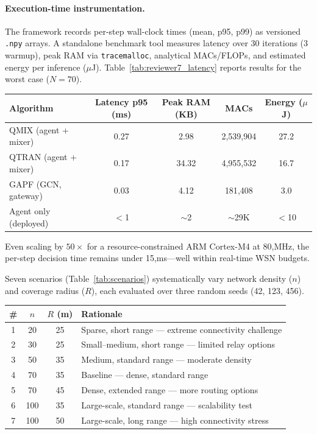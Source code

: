 \documentclass[12pt, onecolumn, journal]{IEEEtran}
\newcounter{reviewer}
\begin{document}
\paragraph{Execution-time instrumentation.}
The framework records per-step wall-clock times (mean, p95, p99) as versioned \texttt{.npy} arrays. A standalone benchmark tool measures latency over 30 iterations (3 warmup), peak RAM via \texttt{tracemalloc}, analytical MACs/FLOPs, and estimated energy per inference ($\mu$J). Table~\ref{tab:reviewer7_latency} reports results for the worst case ($N{=}70$).

\begin{center}
\label{tab:reviewer7_latency}
\renewcommand{\arraystretch}{1.15}
\begin{tabular}{@{}lcccc@{}}
\toprule
\textbf{Algorithm} & \textbf{Latency p95 (ms)} & \textbf{Peak RAM (KB)} & \textbf{MACs} & \textbf{Energy ($\mu$J)} \\
\midrule
QMIX (agent + mixer)   & 0.27 & 2.98  & 2{,}539{,}904 & 27.2 \\
QTRAN (agent + mixer)   & 0.17 & 34.32 & 4{,}955{,}532 & 16.7 \\
GAPF (GCN, gateway)     & 0.03 & 4.12  & 181{,}408     & 3.0  \\
\midrule
Agent only (deployed)    & $<$1 & $\sim$2 & $\sim$29K  & $<$10 \\
\bottomrule
\end{tabular}
\end{center}

Even scaling by $50\times$ for a resource-constrained ARM Cortex-M4 at 80,MHz, the per-step decision time remains under 15,ms---well within real-time WSN budgets.

Seven scenarios (Table~\ref{tab:scenarios}) systematically vary network density ($n$) and coverage radius ($R$), each evaluated over three random seeds (42, 123, 456).

\begin{center}
\label{tab:scenarios}
\begin{tabular}{cccl}
\hline
\textbf{\#} & $n$ & $R$ (m) & \textbf{Rationale} \\
\hline
1 & 20  & 25 & Sparse, short range --- extreme connectivity challenge \\
2 & 30  & 25 & Small--medium, short range --- limited relay options \\
3 & 50  & 35 & Medium, standard range --- moderate density \\
4 & 70  & 35 & Baseline --- dense, standard range \\
5 & 70  & 45 & Dense, extended range --- more routing options \\
6 & 100 & 35 & Large-scale, standard range --- scalability test \\
7 & 100 & 50 & Large-scale, long range --- high connectivity stress \\
\hline
\end{tabular}
\end{center}
\end{document}
